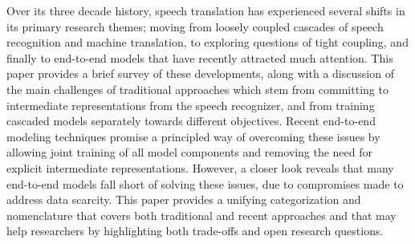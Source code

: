 Over its three decade history, speech translation has experienced several shifts in its primary research themes; moving from loosely coupled cascades of speech recognition and machine translation, to exploring questions of tight coupling, and finally to end-to-end models that have recently attracted much attention. This paper provides a brief survey of these developments, along with a discussion of the main challenges of traditional approaches which stem from committing to intermediate representations from the speech recognizer, and from training cascaded models separately towards different objectives. Recent end-to-end modeling techniques promise a principled way of overcoming these issues by allowing joint training of all model components and removing the need for explicit intermediate representations. However, a closer look reveals that many end-to-end models fall short of solving these issues, due to compromises made to address data scarcity. This paper provides a unifying categorization and nomenclature that covers both traditional and recent approaches and that may help researchers by highlighting both trade-offs and open research questions.
